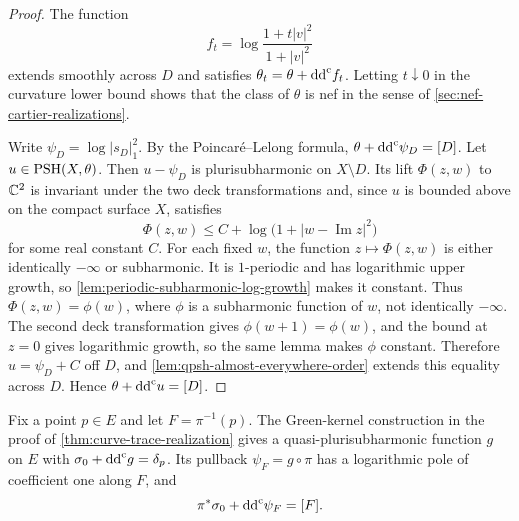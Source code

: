 \begin{proof}
The function
\[
 f_t=\log\frac{1+t|v|^2}{1+|v|^2}
\]
extends smoothly across $D$ and satisfies $\theta_t=\theta+\mathrm{dd}^{\mathrm{c}} f_t$. Letting $t\downarrow0$ in the curvature lower bound shows that the class of $\theta$ is nef in the sense of \cref{sec:nef-cartier-realizations}.

Write $\psi_D=\log|s_D|_1^2$. By the Poincar\'e--Lelong formula, $\theta+\mathrm{dd}^{\mathrm{c}}\psi_D=[D]$. Let $u\in\mathrm{PSH}(X,\theta)$. Then $u-\psi_D$ is plurisubharmonic on $X\setminus D$. Its lift $\Phi(z,w)$ to $\mathbb C^2$ is invariant under the two deck transformations and, since $u$ is bounded above on the compact surface $X$, satisfies
\[
 \Phi(z,w)\leq C+\log\bigl(1+|w-\operatorname{Im}z|^2\bigr)
\]
for some real constant $C$. For each fixed $w$, the function $z\mapsto\Phi(z,w)$ is either identically $-\infty$ or subharmonic. It is $1$-periodic and has logarithmic upper growth, so \cref{lem:periodic-subharmonic-log-growth} makes it constant. Thus $\Phi(z,w)=\phi(w)$, where $\phi$ is a subharmonic function of $w$, not identically $-\infty$. The second deck transformation gives $\phi(w+1)=\phi(w)$, and the bound at $z=0$ gives logarithmic growth, so the same lemma makes $\phi$ constant. Therefore $u=\psi_D+C$ off $D$, and \cref{lem:qpsh-almost-everywhere-order} extends this equality across $D$. Hence $\theta+\mathrm{dd}^{\mathrm{c}} u=[D]$.
\end{proof}

Fix a point $p\in E$ and let $F=\pi^{-1}(p)$. The Green-kernel construction in the proof of \cref{thm:curve-trace-realization} gives a quasi-plurisubharmonic function $g$ on $E$ with $\sigma_0+\mathrm{dd}^{\mathrm{c}} g=\delta_p$. Its pullback $\psi_F=g\circ\pi$ has a logarithmic pole of coefficient one along $F$, and
\[
 \pi^*\sigma_0+\mathrm{dd}^{\mathrm{c}}\psi_F=[F].
\]

